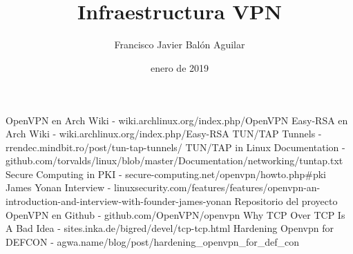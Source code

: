 \documentclass[a4paper, 11pt, titlepage]{article}
\title{\textbf{\nombre} \\ Infraestructura VPN}
\author{Francisco Javier Balón Aguilar}
\date{enero de 2019}
\begin{document}
\maketitle
\renewcommand{\contentsname}{Índice}
\tableofcontents
\newpage

\section{}


\newpage
\begin{thebibliography}{X}
    \bibitem{} OpenVPN en Arch Wiki - wiki.archlinux.org/index.php/OpenVPN
    \bibitem{} Easy-RSA en Arch Wiki - wiki.archlinux.org/index.php/Easy-RSA
    \bibitem{} TUN/TAP Tunnels - rrendec.mindbit.ro/post/tun-tap-tunnels/
    \bibitem{} TUN/TAP in Linux Documentation - github.com/torvalds/linux/blob/master/Documentation/networking/tuntap.txt
    \bibitem{} Secure Computing in PKI - secure-computing.net/openvpn/howto.php\#pki
    \bibitem{} James Yonan Interview - linuxsecurity.com/features/features/openvpn-an-introduction-and-interview-with-founder-james-yonan
    \bibitem{} Repositorio del proyecto OpenVPN en Github - github.com/OpenVPN/openvpn
    \bibitem{} Why TCP Over TCP Is A Bad Idea - sites.inka.de/bigred/devel/tcp-tcp.html
    \bibitem{} Hardening Openvpn for DEFCON - agwa.name/blog/post/hardening\_openvpn\_for\_def\_con
\end{thebibliography}
\end{document}
